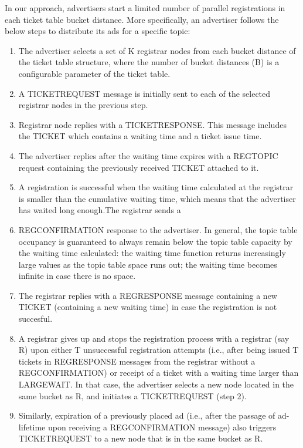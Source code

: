 In our approach, advertisers start a limited number of parallel registrations in each ticket table bucket distance. More specifically, an advertiser follows the below steps to distribute its ads for a specific topic:
\begin{enumerate}
    \item The advertiser selects a set of K registrar nodes from each bucket distance of the ticket table structure, where the number of bucket distances (B) is a configurable parameter of the ticket table.
    \item A TICKETREQUEST message is initially sent to each of the selected registrar nodes in the previous step.
    \item Registrar node replies with a TICKETRESPONSE. This message includes the TICKET which contains a waiting time and a ticket issue time.
    \item The advertiser replies after the waiting time expires with a REGTOPIC request containing the previously received TICKET attached to it.
    \item A registration is successful when the waiting time calculated at the registrar is smaller than the cumulative waiting time, which means that the advertiser has waited long enough.The registrar sends a \item REGCONFIRMATION response to the advertiser. In general, the topic table occupancy is guaranteed to always remain below the topic table capacity by the waiting time calculated: the waiting time function returns increasingly large values as the topic table space runs out; the waiting time becomes infinite in case there is no space.
    \item The registrar replies with a REGRESPONSE message containing a new TICKET (containing a new waiting time) in case the registration is not succesful.
    \item A registrar gives up and stops the registration process with a registrar (say R) upon either T unsuccessful registration attempts (i.e., after being issued T tickets in REGRESPONSE messages from the registrar without a REGCONFIRMATION) or receipt of a ticket with a waiting time larger than LARGEWAIT. In that case, the advertiser selects a new node located in the same bucket as R, and initiates a TICKETREQUEST (step 2).
    \item Similarly, expiration of a previously placed ad (i.e., after the passage of ad-lifetime upon receiving a REGCONFIRMATION message) also triggers TICKETREQUEST to a new node that is in the same bucket as R.
\end{enumerate}


